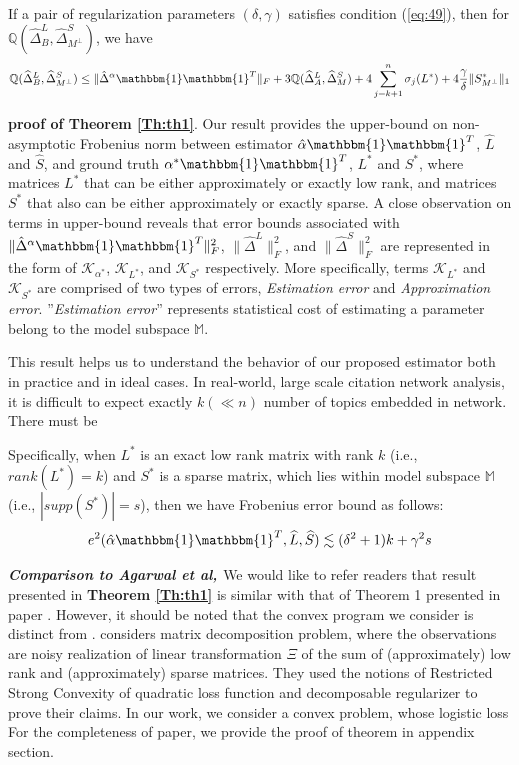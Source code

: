 \documentclass[AMS,STIX1COL]{WileyNJD-v2}
\begin{document}
\begin{lemma} \label{le:le1}
If a pair of regularization parameters $(\delta,\gamma)$ satisfies condition (\ref{eq:49}), then for $\mathbb{Q}(\widehat{\Delta}^L_{B},\widehat{\Delta}^S_{M^\perp})$, we have
\[
    \mathbb{Q}(\widehat{\Delta}^L_{B},\widehat{\Delta}^S_{M^\perp}) \leq
    \|\hat{\Delta}^{\alpha}\mathbbm{1}\mathbbm{1}^T\|_{F} +
    3\mathbb{Q}(\widehat{\Delta}^{L}_{A},\widehat{\Delta}^{S}_{M})+4 \sum_{j=k+1}^{n} \sigma_{j}(L^{*}) + 4\frac{\gamma}{\delta}
    \|S^{*}_{M^\perp}\|_{1}
\]
\end{lemma}

\noindent\textbf{proof of Theorem \ref{Th:th1}}. 
Our result provides the upper-bound on non-asymptotic Frobenius norm between estimator $\hat{\alpha}\mathbbm{1}\mathbbm{1}^T$, $\widehat{L}$ and $\widehat{S}$, and ground truth $\alpha^*\mathbbm{1}\mathbbm{1}^T$, $L^*$ and $S^*$, where matrices $L^*$ that can be either approximately or exactly low rank, and matrices $S^*$ that also can be either approximately or exactly sparse.
A close observation on terms in upper-bound reveals that error bounds associated with $\|\hat{\Delta}^{\alpha}\mathbbm{1}\mathbbm{1}^T\|_{F}^{2}$, $\|\widehat{\Delta}^{L}\|_{F}^{2}$, and $\|\widehat{\Delta}^{S}\|_{F}^{2}$ are represented in the form of $\mathcal{K}_{\alpha^*}$, $\mathcal{K}_{L^*}$, and $\mathcal{K}_{S^*}$ respectively.
More specifically, terms $\mathcal{K}_{L^*}$ and $\mathcal{K}_{S^*}$ are comprised of two types of errors, \emph{Estimation error} and \emph{Approximation error}. ''\emph{Estimation error}'' represents statistical cost of estimating a parameter belong to the model subspace $\mathbb{M}$.

This result helps us to understand the behavior of our proposed estimator both in practice and in ideal cases.
In real-world, large scale citation network analysis, it is difficult to expect exactly $k(\ll n)$ number of topics embedded in network. There must be


Specifically, when $L^*$ is an exact low rank matrix with rank $k$ (i.e., $rank(L^*)=k$) and $S^*$ is a sparse matrix, which lies within model subspace $\mathbb{M}$ (i.e., $|supp(S^*)|=s$), then we have Frobenius error bound as follows:
\[
    e^{2}(\hat{\alpha}\mathbbm{1}\mathbbm{1}^T,\widehat{L},\widehat{S}) \lesssim (\delta^2+1)k+\gamma^2s
\]


\emph{\textbf{Comparison to Agarwal et al, \cite{agarwal2012noisy}}}
We would like to refer readers that result presented in \textbf{Theorem \ref{Th:th1}} is similar with that of Theorem 1 presented in paper \cite{agarwal2012noisy}.
However, it should be noted that the convex program we consider is distinct from \cite{agarwal2012noisy}.
\cite{agarwal2012noisy} considers matrix decomposition problem, where the observations are noisy realization of linear transformation $\Xi$ of the sum of (approximately) low rank and (approximately) sparse matrices.
They used the notions of Restricted Strong Convexity of quadratic loss function and decomposable regularizer to prove their claims. In our work, we consider a convex problem, whose logistic loss
For the completeness of paper, we provide the proof of theorem in appendix section.
\end{document}
